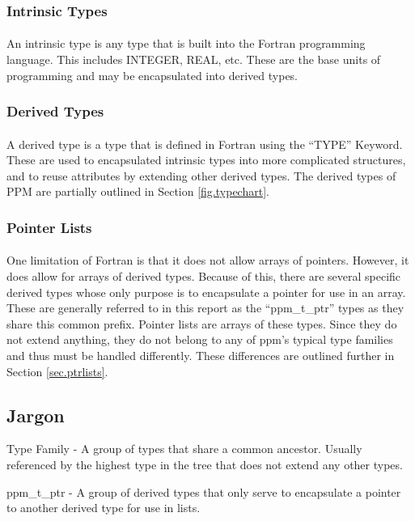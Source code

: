 \documentclass{article}
\begin{document}
\subsubsection{Intrinsic Types}
\paragraph{}
An intrinsic type is any type that is built into the Fortran programming language. This includes INTEGER, REAL, etc. These are the base units of programming and may be encapsulated into derived types.

\subsubsection{Derived Types}
\paragraph{}
A derived type is a type that is defined in Fortran using the ``TYPE'' Keyword. These are used to encapsulated intrinsic types into more complicated structures, and to reuse attributes by extending other derived types. The derived types of PPM are partially outlined in Section \ref{fig.typechart}.

\subsubsection{Pointer Lists}
\paragraph{}
One limitation of Fortran is that it does not allow arrays of pointers. However, it does allow for arrays of derived types. Because of this, there are several specific derived types whose only purpose is to encapsulate a pointer for use in an array. These are generally referred to in this report as the ``ppm\_t\_ptr'' types as they share this common prefix. Pointer lists are arrays of these types. Since they do not extend anything, they do not belong to any of ppm's typical type families and thus must be handled differently. These differences are outlined further in Section \ref{sec.ptrlists}.

\subsection{Jargon}
\begin{list}{}{}
\item Type Family - A group of types that share a common ancestor. Usually referenced by the highest type in the tree that does not extend any other types.
\item ppm\_t\_ptr - A group of derived types that only serve to encapsulate a pointer to another derived type for use in lists.
\end{list}
\end{document}
